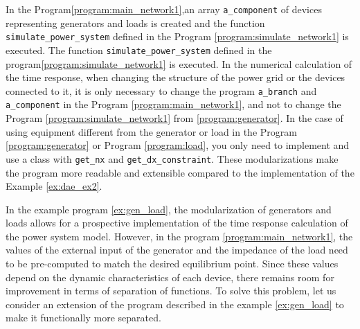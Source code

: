 \documentclass[tombow,dvipdfmx]{corona-a5-1.1}
\begin{document}
\begin{例}
In the Program\nobreak\ref{program:main_network1},an array \verb|a_component| of devices representing generators and loads is created and the function \verb|simulate_power_system| defined in the Program \nobreak\ref{program:simulate_network1} is executed.
The function \verb|simulate_power_system| defined in the program\nobreak\ref{program:simulate_network1} is executed.
In the numerical calculation of the time response, when changing the structure of the power grid or the devices connected to it,
it is only necessary to change the program \verb|a_branch| and \verb|a_component| in the Program \ref{program:main_network1},
and not to change the Program \nobreak\ref{program:simulate_network1} from \nobreak\ref{program:generator}.
In the case of using equipment different from the generator or load in the Program \nobreak\ref{program:generator} or Program \ref{program:load},
you only need to implement and use a class with \verb|get_nx| and \verb|get_dx_constraint|.
These modularizations make the program more readable and extensible compared to the implementation of the Example \ref{ex:dae_ex2}.
\end{例}

In the example program \ref{ex:gen_load}, the modularization of generators and loads allows for a prospective implementation of the time response calculation of the power system model.
However, in the program \nobreak\ref{program:main_network1}, the values of the external input of the generator and the impedance of the load need to be pre-computed to match the desired equilibrium point.
Since these values depend on the dynamic characteristics of each device, there remains room for improvement in terms of separation of functions.
To solve this problem, let us consider an extension of the program described in the example \ref{ex:gen_load} to make it functionally more separated.
\end{document}
